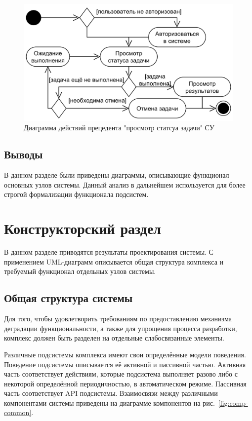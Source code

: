 \documentclass[a4paper,12pt]{report}
\numberwithin{equation}{section}
\begin{document}
  \begin{figure}
    \centering
    \includegraphics[width=\linewidth]{diagrams/logic/activity-view}
    \caption{Диаграмма действий прецедента "просмотр статсуа задачи" СУ}
    \label{fig:logic-view}
  \end{figure}
  
  \subsection{Выводы}
  В данном разделе были приведены диаграммы, описывающие функционал основных узлов системы.
  Данный анализ в дальнейшем используется для более строгой формализации функционала подсистем.
  
  \clearpage
  \section{Конструкторский раздел}
  
  В данном разделе приводятся результаты проектирования системы.
  С применением UML-диаграмм описывается общая структура комплекса и требуемый функционал отдельных узлов системы.
  
  \subsection{Общая структура системы}
  Для того, чтобы удовлетворить требованиям по предоставлению механизма деградации функциональности,
  а также для упрощения процесса разработки, комплекс должен быть разделен на отдельные слабосвязанные элементы.
  
  Различные подсистемы комплекса имеют свои определённые модели поведения.
  Поведение подсистемы описывается её активной и пассивной частью.
  Активная часть соответствует действиям, которые подсистема выполняет разово либо с некоторой определённой периодичностью, в автоматическом режиме.
  Пассивная часть соответствует API подсистемы.
  Взаимосвязи между различными компонентами системы приведены на диаграмме компонентов на рис.~\ref{fig:comp-common}.
  
\end{document}
